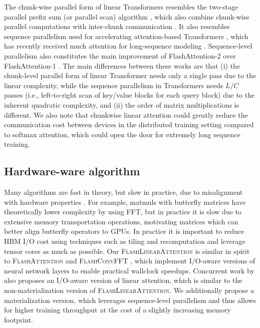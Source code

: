 The chunk-wise parallel form of linear Transformers resembles the two-stage parallel prefix sum (or parallel scan) algorithm \citep{Blelloch1990PrefixSA}, which also combine chunk-wise parallel computations with inter-chunk communication \citep{Chaurasia2015CompilingHP}.  It also resembles sequence parallelism used for accelerating attention-based Transformers  \citep{li-etal-2023-sequence}, which has recently received  much attention  for long-sequence modeling \citep{Liu2023RingAW, Li2023LightSeqSL, Brandon2023StripedAF}. Sequence-level parallelism also constitutes the main improvement of FlashAttention-2 \citep{flashattention2} over FlashAttention-1 \citep{flashattention1}. The main differences between these works are that (i) the chunk-level parallel form of linear Transformer needs only a single pass due to the linear complexity, while the sequence parallelism in Transformers needs $L/C$ passes (i.e., left-to-right scan of key/value blocks for each query block) due to the inherent quadratic complexity, and (ii) the order of matrix multiplications is different. We also note that chunkwise linear attention could greatly reduce the communication cost between devices in the distributed training setting compared to softmax attention, which could open the door for extremely long sequence training.


\subsection{Hardware-ware algorithm} Many algorithms are fast in theory, but slow in practice, due to misalignment with hardware properties \cite{Hooker2020TheHL,Saphra2023FirstTT}. 
For example, matmuls with butterfly matrices have theoretically lower complexity by using FFT, but in practice it is slow due to extensive memory  transportation operations, motivating matrices  \cite{Dao2022MonarchES,Fu2023MonarchMA} which can better align butterfly operators to GPUs. In practice it is important to reduce HBM I/O cost using techniques such as tiling and recomputation  and leverage tensor cores as much as possible. Our \textsc{FlashLinearAttention} is similar in spirit to \textsc{FlashAttention} \cite{flashattention1,flashattention2} and \textsc{FlashConvFFT} \cite{flashconvfft}, which implement I/O-aware versions of neural network layers to enable practical wallclock speedups. Concurrent work by \citet{lightning2} also proposes an I/O-aware version of linear attention, which is  similar to the non-materialization version of  \textsc{FlashLinearAttention}. We additionally propose a materialization version, which leverages sequence-level parallelism and thus allows for higher training throughput at the cost of a slightly increasing memory footprint.
\label{sec:gla_algo}




